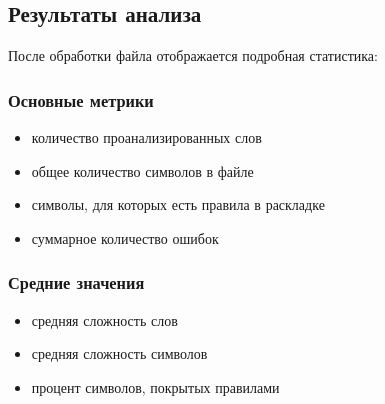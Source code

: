 \documentclass[a4paper,11pt,russian,openany,oneside]{sphinxmanual}
\begin{document}
\subsection{Результаты анализа}
\label{\detokenize{usage:id9}}
\sphinxAtStartPar
После обработки файла отображается подробная статистика:


\subsubsection{Основные метрики}
\label{\detokenize{usage:id10}}\begin{itemize}
\item {} 
\sphinxAtStartPar
{} \sphinxhyphen{} количество проанализированных слов

\item {} 
\sphinxAtStartPar
{} \sphinxhyphen{} общее количество символов в файле

\item {} 
\sphinxAtStartPar
{} \sphinxhyphen{} символы, для которых есть правила в раскладке

\item {} 
\sphinxAtStartPar
{} \sphinxhyphen{} суммарное количество ошибок

\end{itemize}


\subsubsection{Средние значения}
\label{\detokenize{usage:id11}}\begin{itemize}
\item {} 
\sphinxAtStartPar
{} \sphinxhyphen{} средняя сложность слов

\item {} 
\sphinxAtStartPar
{} \sphinxhyphen{} средняя сложность символов

\item {} 
\sphinxAtStartPar
{} \sphinxhyphen{} процент символов, покрытых правилами

\end{itemize}
\end{document}
